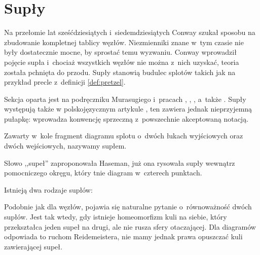 
\section{Supły}
\label{sec:tangle}
Na przełomie lat sześćdziesiątych i~siedemdziesiątych Conway szukał sposobu na zbudowanie kompletnej tablicy węzłów.
Niezmienniki znane w~tym czasie nie były dostatecznie mocne, by sprostać temu wyzwaniu.
Conway wprowadził pojęcie supła i~chociaż wszystkich węzłów nie można z~nich uzyskać, teoria została pchnięta do przodu.
Supły stanowią budulec splotów takich jak na przykład precle z~definicji \ref{def:pretzel}.

Sekcja oparta jest na podręczniku Murasugiego \cite{murasugi96} i~pracach \cite{conway70}, \cite{kauffman97}, \cite{kauffman04}, a~także \cite{schubert56}.
Supły występują także w polskojęzycznym artykule \cite{janiak04}, ten zawiera jednak nieprzyjemną pułapkę: wprowadza konwencję sprzeczną z~powszechnie akceptowaną notacją.

\begin{definition}[supeł]
    \label{def:tangle}
    Zawarty w~kole fragment diagramu splotu o~dwóch łukach wyjściowych oraz dwóch wejściowych, nazywamy supłem.
\end{definition}

Słowo ,,supeł'' zaproponowała Haseman, już ona rysowała supły wewnątrz pomocniczego okręgu, który tnie diagram w~czterech punktach.

Istnieją dwa rodzaje supłów:
\begin{comment}
\begin{figure}[H]
    \centering
    \begin{minipage}[b]{.48\linewidth}
        \[\LargeTangleAlternatingYes\]
        \subcaption{supeł naprzemienny}
    \end{minipage}
    \begin{minipage}[b]{.48\linewidth}
        \centering
        \[\LargeTangleAlternatingNo\]
        \subcaption{supeł sąsiądujący}
    \end{minipage}
\end{figure}
\end{comment}

Podobnie jak dla węzłów, pojawia się naturalne pytanie o~równoważność dwóch supłów.
Jest tak wtedy, gdy istnieje homeomorfizm kuli na siebie, który przekształca jeden supeł na drugi, ale nie rusza sfery otaczającej.
Dla diagramów odpowiada to ruchom Reidemeistera, nie mamy jednak prawa opuszczać kuli zawierającej supeł.

